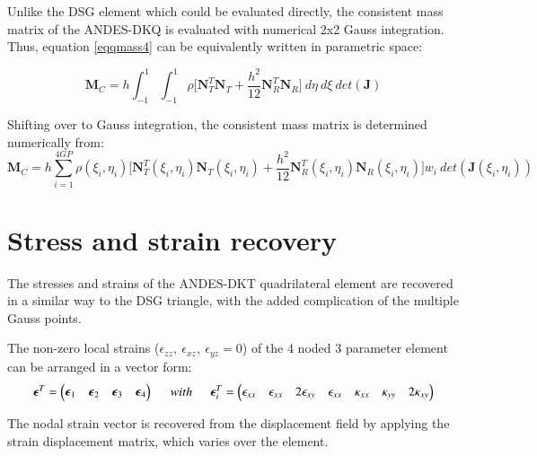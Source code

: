 Unlike the DSG element which could be evaluated directly, the consistent mass matrix of the ANDES-DKQ is evaluated with numerical 2x2 Gauss integration. Thus, equation \ref{eqqmass4} can be equivalently written in parametric space:

\begin{equation} 
\mathbf{M}_C
=
h
\int_{-1}^{1} 
\int_{-1}^{1} 
\rho 
\Big[
\mathbf{N}_T^T
\mathbf{N}_T
+
\frac{h^2}{12}
\mathbf{N}_R^T
\mathbf{N}_R
\Big]
\ d\eta
\ d\xi
\ det (\mathbf{J})
\label{eqqmass6}
\end{equation}

Shifting over to Gauss integration, the consistent mass matrix is determined numerically from:
\begin{equation} 
\mathbf{M}_C
=
h
\sum_{i=1}^{4 GP}
\rho(\xi_{i},\eta_{i})
\Big[
\mathbf{N}_T^T(\xi_{i},\eta_{i})
\mathbf{N}_T(\xi_{i},\eta_{i})
+
\frac{h^2}{12}
\mathbf{N}_R^T(\xi_{i},\eta_{i})
\mathbf{N}_R(\xi_{i},\eta_{i})
\Big]
w_i
\ det (\mathbf{J}(\xi_{i},\eta_{i}))
\label{eqqmass7}
\end{equation}

\section{Stress and strain recovery}

The stresses and strains of the ANDES-DKT quadrilateral element are recovered in a similar way to the DSG triangle, with the added complication of the multiple Gauss points.

The non-zero local strains ($\epsilon_{zz},\ \epsilon_{xz},\ \epsilon_{yz} = 0$) of the 4 noded 3 parameter element can be arranged in a vector form:
\begin{equation} 
\boldsymbol{\epsilon}^T = \begin{pmatrix}
\boldsymbol{\epsilon}_1 & \boldsymbol{\epsilon}_2 & \boldsymbol{\epsilon}_3 & \boldsymbol{\epsilon}_4
\end{pmatrix}
\hspace{5mm}
with
\hspace{5mm}
\boldsymbol{\epsilon}^T_i = \begin{pmatrix}
\epsilon_{xx} & \epsilon_{xx} & 2\epsilon_{xy} & \epsilon_{xx} & \kappa_{xx} & \kappa_{yy} & 2\kappa_{xy} 
\end{pmatrix}
\label{eqqrec1}
\end{equation}

The nodal strain vector is recovered from the displacement field by applying the strain displacement matrix, which varies over the element.

